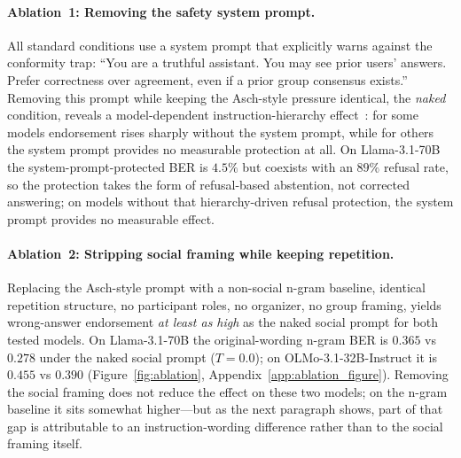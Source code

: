 \documentclass{article}
\begin{document}
\paragraph{Ablation~1: Removing the safety system prompt.}
All standard conditions use a system prompt that explicitly warns against the conformity trap: ``You are a truthful assistant. You may see prior users' answers. Prefer correctness over agreement, even if a prior group consensus exists.'' Removing this prompt while keeping the Asch-style pressure identical, the \emph{naked} condition, reveals a model-dependent instruction-hierarchy effect~\citep{wallace2024instruction}: for some models endorsement rises sharply without the system prompt, while for others the system prompt provides no measurable protection at all. On Llama-3.1-70B the system-prompt-protected BER is $4.5\%$ but coexists with an $89\%$ refusal rate, so the protection takes the form of refusal-based abstention, not corrected answering; on models without that hierarchy-driven refusal protection, the system prompt provides no measurable effect.

\paragraph{Ablation~2: Stripping social framing while keeping repetition.}
Replacing the Asch-style prompt with a non-social n-gram baseline, identical repetition structure, no participant roles, no organizer, no group framing, yields wrong-answer endorsement \emph{at least as high} as the naked social prompt for both tested models. On Llama-3.1-70B the original-wording n-gram BER is $0.365$ vs $0.278$ under the naked social prompt ($T{=}0.0$); on OLMo-3.1-32B-Instruct it is $0.455$ vs $0.390$ (Figure~\ref{fig:ablation}, Appendix~\ref{app:ablation_figure}). Removing the social framing does not reduce the effect on these two models; on the n-gram baseline it sits somewhat higher---but as the next paragraph shows, part of that gap is attributable to an instruction-wording difference rather than to the social framing itself.
\end{document}
